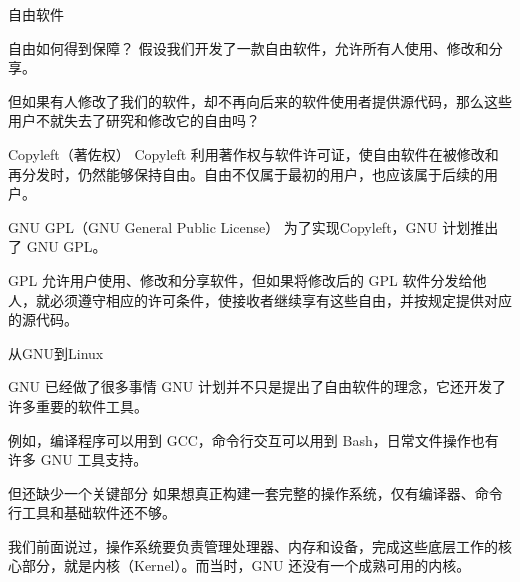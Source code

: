 \documentclass[aspectratio=169]{beamer}
\begin{document}
\begin{frame}{自由软件}
	\begin{block}{自由如何得到保障？}
		\hspace*{2em}假设我们开发了一款自由软件，允许所有人使用、修改和分享。
		\par\hspace*{2em}但如果有人修改了我们的软件，却不再向后来的软件使用者提供源代码，那么这些用户不就失去了研究和修改它的自由吗？
	\end{block}
	\begin{block}{Copyleft（著佐权）}
		\hspace*{2em}Copyleft 利用著作权与软件许可证，使自由软件在被修改和再分发时，仍然能够保持自由。\alert{自由不仅属于最初的用户，也应该属于后续的用户。}
	\end{block}
	\begin{block}{GNU GPL（GNU General Public License）}
		\hspace*{2em}为了实现Copyleft，GNU 计划推出了 GNU GPL。
		\par\hspace*{2em}GPL 允许用户使用、修改和分享软件，但如果将修改后的 GPL 软件分发给他人，就必须遵守相应的许可条件，使接收者继续享有这些自由，并按规定提供对应的源代码。
	\end{block}	
\end{frame}
\begin{frame}{从GNU到Linux}
	\begin{block}{GNU 已经做了很多事情}
		\hspace*{2em}GNU 计划并不只是提出了自由软件的理念，它还开发了许多重要的软件工具。
		\par\hspace*{2em}例如，编译程序可以用到 GCC，命令行交互可以用到 Bash，日常文件操作也有许多 GNU 工具支持。
	\end{block}
	\begin{block}{但还缺少一个关键部分}
		\hspace*{2em}如果想真正构建一套完整的操作系统，仅有编译器、命令行工具和基础软件还不够。
		\par\hspace*{2em}我们前面说过，操作系统要负责管理处理器、内存和设备，完成这些底层工作的核心部分，就是\alert{内核（Kernel）}。而当时，GNU 还没有一个成熟可用的内核。
	\end{block}
\end{frame}
\end{document}
